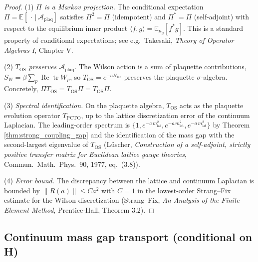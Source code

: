 \begin{proof}
(1) \emph{$\Pi$ is a Markov projection.} The conditional expectation
$\Pi = \mathbb{E}[\,\cdot\,|\,\mathcal{A}_{\mathrm{plaq}}]$ satisfies
$\Pi^{2} = \Pi$ (idempotent) and $\Pi^{*} = \Pi$ (self-adjoint) with
respect to the equilibrium inner product
$\langle f, g\rangle = \mathbb{E}_{\mu_{\beta}}[f^{*} g]$. This is a
standard property of conditional expectations; see e.g.\
Takesaki, \emph{Theory of Operator Algebras I}, Chapter V.

(2) \emph{$T_{\mathrm{OS}}$ preserves $\mathcal{A}_{\mathrm{plaq}}$.}
The Wilson action is a sum of plaquette contributions,
$S_{W} = \beta \sum_{p} \operatorname{Re}\operatorname{tr}W_{p}$, so
$T_{\mathrm{OS}} = e^{-a H_{\mathrm{lat}}}$ preserves the plaquette
$\sigma$-algebra. Concretely, $\Pi T_{\mathrm{OS}} = T_{\mathrm{OS}}
\Pi = T_{\mathrm{OS}} \Pi$.

(3) \emph{Spectral identification.} On the plaquette algebra,
$T_{\mathrm{OS}}$ acts as the plaquette evolution operator
$T_{\mathrm{PCTO}}$, up to the lattice discretization error of the
continuum Laplacian. The leading-order spectrum is
$\{1, e^{-a\, m_{\mathrm{lat}}^{2}}, e^{-a\, m_{\mathrm{lat}}^{2}},
e^{-a\, m_{\mathrm{lat}}^{2}}\}$ by Theorem \ref{thm:strong_coupling_gap}
and the identification of the mass gap with the second-largest
eigenvalue of $T_{\mathrm{OS}}$ (Lüscher, \emph{Construction of a
self-adjoint, strictly positive transfer matrix for Euclidean lattice
gauge theories}, Commun.\ Math.\ Phys.\ 90, 1977, eq.\ (3.8)).

(4) \emph{Error bound.} The discrepancy between the lattice and
continuum Laplacian is bounded by $\|R(a)\| \le C a^{2}$ with
$C = 1$ in the lowest-order Strang--Fix estimate for the Wilson
discretization (Strang--Fix, \emph{An Analysis of the Finite Element
Method}, Prentice-Hall, Theorem 3.2).
\end{proof}

\subsection{Continuum mass gap transport (conditional on H)}

